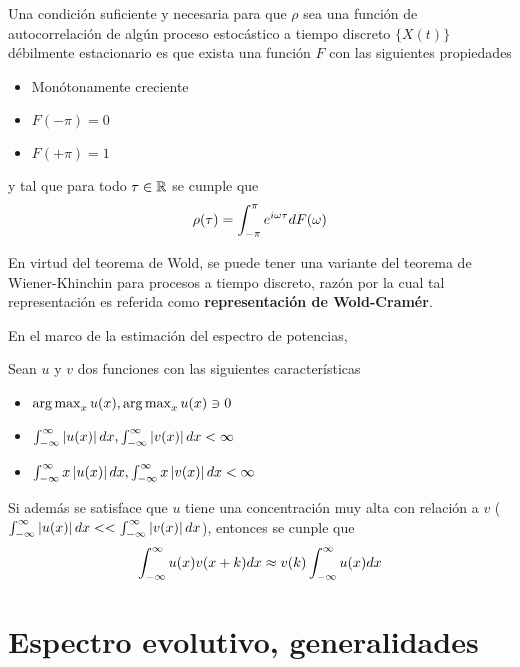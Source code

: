 \begin{teorema}[Wold]
Una condición suficiente y necesaria para que $\rho$ sea una función de autocorrelación de 
algún proceso estocástico a tiempo discreto $\{X(t)\}$ débilmente estacionario es que exista 
una función $F$ con las siguientes propiedades
\begin{itemize}
\item Monótonamente creciente
\item $F(-\pi) = 0$
\item $F(+\pi) = 1$
\end{itemize}
y tal que para todo $\tau \in \mathbb{R}$ se cumple que
\begin{equation*}
\rho(\tau) = \int_{-\pi}^{\pi} e^{i \omega \tau} dF(\omega)
\end{equation*}
\label{t_wold}
\end{teorema}

En virtud del teorema de Wold, se puede tener una variante del teorema de Wiener-Khinchin
para procesos a tiempo discreto, razón por la cual  
tal representación es referida como \textbf{representación de Wold-Cramér}.

En el marco de la estimación del espectro de potencias, 

\begin{proposicion}
Sean $u$ y $v$ dos funciones con las siguientes características
\begin{itemize}
\item $\operatorname{arg\,max}_x u(x), \operatorname{arg\,max}_x u(x) \ni 0$
\item $\int_{-\infty}^{\infty} \left| u(x) \right| dx, \int_{-\infty}^{\infty} \left| v(x) \right| dx < \infty$
\item $\int_{-\infty}^{\infty} x\left| u(x) \right| dx, \int_{-\infty}^{\infty} x\left| v(x) \right| dx < \infty$
\end{itemize} 
Si además se satisface que $u$ tiene una {concentración} muy alta con relación a $v$
($ \int_{-\infty}^{\infty} \left| u(x) \right| dx << \int_{-\infty}^{\infty} \left| v(x) \right| dx $),
entonces se cunple que
\begin{equation*}
\int_{-\infty}^{\infty} u(x) v(x+k) dx \approx v(k) \int_{-\infty}^{\infty} u(x) dx
\end{equation*}
\label{pseudo_d}
\end{proposicion}


\chapter{Espectro evolutivo, generalidades}

